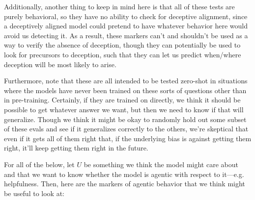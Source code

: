 {{Additionally, another thing to keep in mind here is that all of these tests are purely behavioral, so they have no ability to check for deceptive alignment\cite{TODO: cite https://www.alignmentforum.org/posts/A9NxPTwbw6r6Awuwt/how-likely-is-deceptive-alignment}, since a deceptively aligned model could pretend to have whatever behavior here would avoid us detecting it\cite{TODO: cite https://www.alignmentforum.org/posts/PP2Lrpvhd3bBvR8Aj/smoke-without-fire-is-scary}. As a result, these markers can't and shouldn't be used as a way to verify the absence of deception, though they can potentially be used to look for precursors to deception, such that they can let us predict when/where deception will be most likely to arise.

Furthermore, note that these are all intended to be tested zero-shot in situations where the models have never been trained on these sorts of questions other than in pre-training. Certainly, if they are trained on directly, we think it should be possible to get whatever answer we want, but then we need to know if that will generalize. Though we think it might be okay to randomly hold out some subset of these evals and see if it generalizes correctly to the others, we're skeptical that even if it gets all of them right that, if the underlying bias is against getting them right, it'll keep getting them right in the future.

For all of the below, let $U$ be something we think the model might care about and that we want to know whether the model is agentic with respect to it---e.g. helpfulness\cite{TODO: cite https://arxiv.org/abs/2204.05862}. Then, here are the markers of agentic behavior that we think might be useful to look at:



}}
